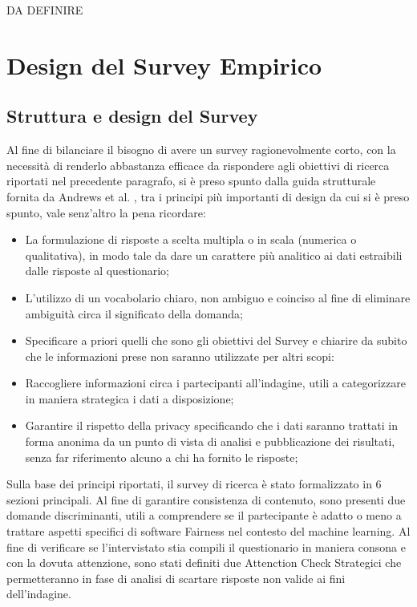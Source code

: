     DA DEFINIRE
    
    \section{Design del Survey Empirico}
    \subsection{Struttura e design del Survey}
    Al fine di bilanciare il bisogno di avere un survey ragionevolmente corto, con la necessità di renderlo abbastanza efficace da rispondere agli obiettivi di ricerca riportati nel precedente paragrafo, si è preso spunto dalla guida strutturale fornita da Andrews et al. \cite{andrews2007conducting}, tra i principi più importanti di design da cui si è preso spunto, vale senz'altro la pena ricordare:
    
    \begin{itemize}
        \item La formulazione di risposte a scelta multipla o in scala (numerica o qualitativa), in modo tale da dare un carattere più analitico ai dati estraibili dalle risposte al questionario;
        \item L'utilizzo di un vocabolario chiaro, non ambiguo e coinciso al fine di eliminare ambiguità circa il significato della domanda;
        \item Specificare a priori quelli che sono gli obiettivi del Survey e chiarire da subito che le informazioni prese non saranno utilizzate per altri scopi:
        \item Raccogliere informazioni circa i partecipanti all'indagine, utili a categorizzare in maniera strategica i dati a disposizione;
        \item Garantire il rispetto della privacy specificando che i dati saranno trattati in forma anonima da un punto di vista di analisi e pubblicazione dei risultati, senza far riferimento alcuno a chi ha fornito le risposte;
    \end{itemize}
    
    Sulla base dei principi riportati, il survey di ricerca è stato formalizzato in 6 sezioni principali. Al fine di garantire consistenza di contenuto, sono presenti due domande discriminanti, utili a comprendere se il partecipante è adatto o meno a trattare aspetti specifici di software Fairness nel contesto del machine learning. Al fine di verificare se l'intervistato stia compili il questionario in maniera consona e con la dovuta attenzione, sono stati definiti due Attenction Check Strategici che permetteranno in fase di analisi di scartare risposte non valide ai fini dell'indagine.\\ 
    
